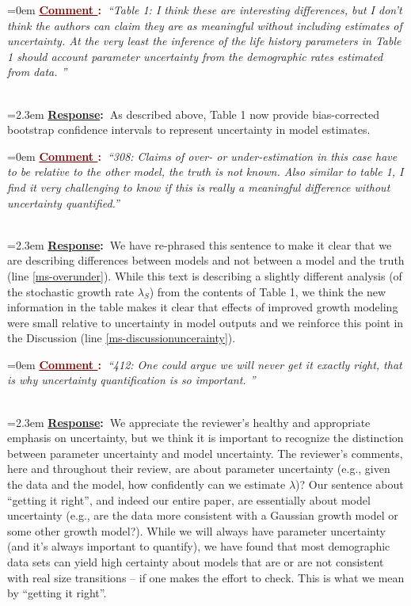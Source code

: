 \documentclass[12pt]{article}
\newcounter{cN}
\newcommand{\comment}[1]{
	\vspace{2em}
	\refstepcounter{cN} %
	\noindent \hangindent=0em \textbf{\textcolor{Maroon}{\uline{Comment \thecN}:~}}\emph{``#1''}
	}
\newcommand{\response}[1]{
	\\[0.25em]
	\hangindent=2.3em \textbf{\textcolor{NavyBlue}{\uline{Response}:~}}#1
	}
\begin{document}
\comment{Table 1: I think these are interesting differences, but I don’t think the authors can claim they are as meaningful without including estimates of uncertainty. At the very least the inference of the life history parameters in Table 1 should account parameter uncertainty from the demographic rates estimated from data. }
\response{As described above, Table 1 now provide bias-corrected bootstrap confidence intervals to represent uncertainty in model estimates.}

\comment{308: Claims of over- or under-estimation in this case have to be relative to the other model, the truth is not known. Also similar to table 1, I find it very challenging to know if this is really a meaningful difference without uncertainty quantified.}
\response{We have re-phrased this sentence to make it clear that we are describing differences between models and not between a model and the truth (line \ref{ms-overunder}). While this text is describing a slightly different analysis (of the stochastic growth rate $\lambda_S$) from the contents of Table 1, we think the new information in the table makes it clear that effects of improved growth modeling were small relative to uncertainty in model outputs and we reinforce this point in the Discussion (line \ref{ms-discussionuncerainty}).} 

\comment{412: One could argue we will never get it exactly right, that is why uncertainty quantification is so important. }
\response{We appreciate the reviewer's healthy and appropriate emphasis on uncertainty, but we think it is important to recognize the distinction between parameter uncertainty and model uncertainty. The reviewer's comments, here and throughout their review, are about parameter uncertainty (e.g., given the data and the model, how confidently can we estimate $\lambda$)? Our sentence about ``getting it right'', and indeed our entire paper, are essentially about model uncertainty (e.g., are the data more consistent with a Gaussian growth model or some other growth model?). While we will always have parameter uncertainty (and it's always important to quantify), we have found that most demographic data sets can yield high certainty about models that are or are not consistent with real size transitions -- if one makes the effort to check. This is what we mean by ``getting it right''.}
\end{document}
